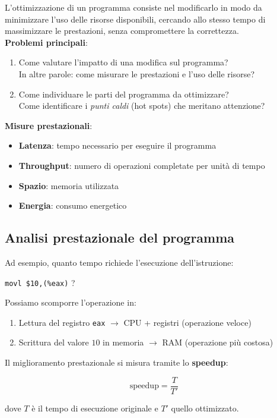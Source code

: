 L'ottimizzazione di un programma consiste nel modificarlo in modo da minimizzare 
l'uso delle risorse disponibili, cercando allo stesso tempo di massimizzare le prestazioni, 
senza compromettere la correttezza.\\
\noindent\textbf{Problemi principali}:
\begin{enumerate}
    \item Come valutare l'impatto di una modifica sul programma?\\
    In altre parole: come misurare le prestazioni e l'uso delle risorse?
    \item Come individuare le parti del programma da ottimizzare?\\
    Come identificare i \textit{punti caldi} (hot spots) che meritano attenzione?
\end{enumerate}
\noindent\textbf{Misure prestazionali}:
\begin{itemize}
    \item \textbf{Latenza}: tempo necessario per eseguire il programma
    \item \textbf{Throughput}: numero di operazioni completate per unità di tempo
    \item \textbf{Spazio}: memoria utilizzata
    \item \textbf{Energia}: consumo energetico
\end{itemize}
\subsection{Analisi prestazionale del programma}
Ad esempio, quanto tempo richiede l'esecuzione dell'istruzione:
\begin{center}
\texttt{movl \$10,(\%eax)} ?
\end{center}
Possiamo scomporre l'operazione in:
\begin{enumerate}
    \item Lettura del registro \texttt{eax} $\rightarrow$ CPU + registri (operazione veloce)
    \item Scrittura del valore $10$ in memoria $\rightarrow$ RAM (operazione più costosa)
\end{enumerate}
\noindent Il miglioramento prestazionale si misura tramite lo \textbf{speedup}:

\[
\text{speedup} = \frac{T}{T'}
\]

\noindent dove $T$ è il tempo di esecuzione originale e $T'$ quello ottimizzato.

